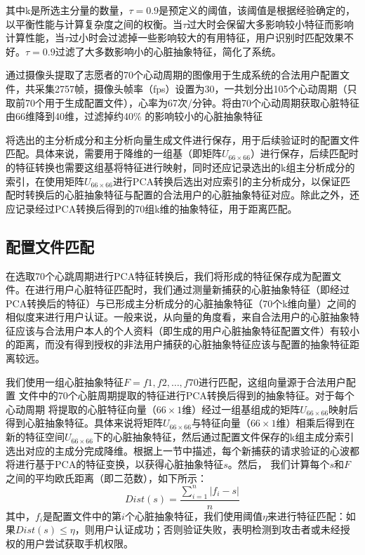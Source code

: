 {其中k是所选主分量的数量，$\tau=0.9$是预定义的阈值，该阈值是根据经验确定的，以平衡性能与计算复杂度之间的权衡。当$\tau$过大时会保留大多影响较小特征而影响计算性能，当$\tau$过小时会过滤掉一些影响较大的有用特征，用户识别时匹配效果不好。$\tau=0.9$过滤了大多数影响小的心脏抽象特征，简化了系统。}
\par
{通过摄像头提取了志愿者的70个心动周期的图像用于生成系统的合法用户配置文件，共采集2757帧，摄像头帧率（fps）设置为30，一共划分出105个心动周期（只取前70个用于生成配置文件），心率为67次/分钟。将由70个心动周期获取心脏特征由66维降到40维，过滤掉约40\% 的影响较小的心脏抽象特征}
\par
{将选出的主分析成分和主分析向量生成文件进行保存，用于后续验证时的配置文件匹配。具体来说，需要用于降维的一组基（即矩阵$ U_{66\times 66}$）进行保存，后续匹配时的特征转换也需要这组基将特征进行映射，同时还应记录选出的k组主分析成分的索引，在使用矩阵$ U_{66\times 66}$进行PCA转换后选出对应索引的主分析成分，以保证匹配时转换后的心脏抽象特征与配置的合法用户的心脏抽象特征对应。除此之外，还应记录经过PCA转换后得到的70组k维的抽象特征，用于距离匹配。}
\subsection{配置文件匹配}
{在选取70个心跳周期进行PCA特征转换后，我们将形成的特征保存成为配置文件。在进行用户心脏特征匹配时，我们通过测量新捕获的心脏抽象特征（即经过PCA转换后的特征）与已形成主分析成分的心脏抽象特征（70个k维向量）之间的相似度来进行用户认证。一般来说，从向量的角度看，来自合法用户的心脏抽象特征应该与合法用户本人的个人资料（即生成的用户心脏抽象特征配置文件）有较小的距离，而没有得到授权的非法用户捕获的心脏抽象特征应该与配置的抽象特征距离较远。}
\par
{
我们使用一组心脏抽象特征$F={f1,f2,\dots ,f70}$进行匹配，这组向量源于合法用户配置 文件中的70个心脏周期提取的特征进行PCA转换后得到的抽象特征。对于每个心动周期
将提取的心脏特征向量（$66\times 1$维）经过一组基组成的矩阵$ U_{66\times 66}$映射后得到心脏抽象特征。具体来说将矩阵$ U_{66\times 66}$与特征向量（$66\times 1$维）相乘后得到在新的特征空间$ U_{66\times 66}$下的心脏抽象特征，然后通过配置文件保存的k组主成分索引选出对应的主成分完成降维。根据上一节中描述，每个新捕获的请求验证的心波都将进行基于PCA的特征变换，以获得心脏抽象特征$s$。然后， 我们计算每个$s$和$F$之间的平均欧氏距离（即二范数），如下所示：
}
\begin{equation}
    Dist(s)=\frac{\sum_{i=1}^{n}{|f_i-s|}}{n}
\end{equation}
{其中，$f_i$是配置文件中的第$i$个心脏抽象特征，我们使用阈值$\eta$来进行特征匹配：如果$Dist(s)\leq \eta$，则用户认证成功；否则验证失败，表明检测到攻击者或未经授权的用户尝试获取手机权限。}

